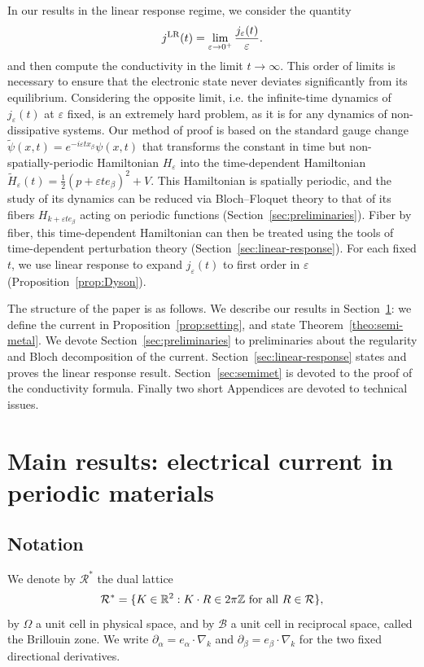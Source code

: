 \documentclass[a4paper,11pt]{article}
\theoremstyle{plain}
\theoremstyle{remark}
\def\R{{\mathbb R}}
\def\Z{{\mathbb Z}}
\def\eps{{\varepsilon}}
\def\cB{{\mathcal B}}
\def\cR{{\mathcal R}}
\begin{document}
In our results in the linear response regime, we consider the quantity
\begin{align*}
  j^{\rm LR}(t) = \lim_{\eps \to 0^+} \frac {j_\eps(t)}{\eps}.
\end{align*}
and then compute the conductivity in the limit $t \to \infty$. This
order of limits is necessary to ensure that the electronic state never
deviates significantly from its equilibrium. Considering the opposite
limit, i.e. the infinite-time dynamics of
$j_\eps(t)$ at $\eps$ fixed, is an extremely
hard problem, as it is for any dynamics of non-dissipative systems.
Our method of proof is based on the standard gauge change
$\widetilde\psi(x,t)=e^{-i\eps t x_\beta}\psi(x,t)$
that transforms the constant in time but non-spatially-periodic
Hamiltonian $H_\eps$ into the time-dependent Hamiltonian
$\widetilde H_\eps(t)=\frac12(p+\eps t e_\beta)^2+V$.
This Hamiltonian is spatially periodic, and the study of its dynamics
can be reduced via Bloch--Floquet theory to that of its fibers
$H_{k+\eps t e_\beta}$ acting on periodic functions
(Section~\ref{sec:preliminaries}). Fiber by fiber, this time-dependent
Hamiltonian can then be treated using the tools of time-dependent
perturbation theory (Section~\ref{sec:linear-response}). For each fixed $t$,
we use linear response to expand $j_\eps(t)$ to first order in $\eps$
(Proposition~\ref{prop:Dyson}).


The structure of the paper is as follows. We describe our results in
Section~\ref{sec:results}: we define the current in
Proposition~\ref{prop:setting}, and state Theorem~\ref{theo:semi-metal}.
We devote Section~\ref{sec:preliminaries} to preliminaries about the
regularity and Bloch decomposition of the current.
Section~\ref{sec:linear-response} states and proves the linear response result.
Section~\ref{sec:semimet} is devoted to the proof of the conductivity
formula. Finally two short Appendices are devoted to technical issues.

\section{Main results: electrical current in periodic materials}\label{sec:results}


\subsection{Notation}
\label{sec:notation}
We denote by $\cR^*$ the dual lattice
\[
\cR^*=\{K\in\R^2:K\cdot R\in2\pi\Z\hbox{ for all }R\in\cR\},
\]
by $\Omega$ a unit cell in physical space, and by $\cB$ a unit cell in
reciprocal space, called the Brillouin zone. We write
$\partial_\alpha=e_\alpha\cdot\nabla_k$ and
$\partial_\beta=e_\beta\cdot\nabla_k$ for the two fixed directional derivatives.
\end{document}
